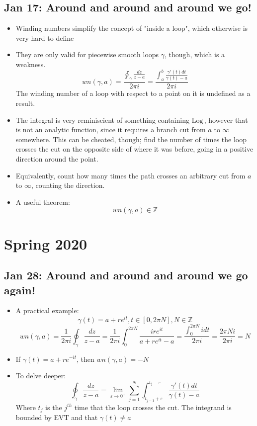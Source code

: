 \documentclass[10pt, oneside]{article}
\let\ep\varepsilon
\newcommand{\Z}{\mathbb{Z}}
\newcommand{\Log}{\text{Log} \,}
\begin{document}
\subsection{Jan 17: Around and around and around we go!}
\begin{itemize}
    \item Winding numbers simplify the concept of "inside a loop", which otherwise is very hard to define
    \item They are only valid for piecewise smooth loops $\gamma$, though, which is a weakness.
        \[wn(\gamma,a) = \frac{\oint_\gamma \frac{dz}{z - a}}{2\pi i} = \frac{\int_a^b \frac{\gamma'(t) dt}{\gamma(t) - a}}{2\pi i}\]
        The winding number of a loop with respect to a point on it is undefined as a result.
    \item The integral is very reminiscient of something containing $\Log$, however that is not an analytic function, since it requires a branch cut from $a$ to $\infty$ somewhere. This can be cheated, though; find the number of times the loop crosses the cut on the opposite side of where it was before, going in a positive direction around the point.
    \item Equivalently, count how many times the path crosses an arbitrary cut from $a$ to $\infty$, counting the direction.
    \item A useful theorem:
        \[wn(\gamma,a) \in \Z\]
\end{itemize}

\section{Spring 2020}

\subsection{Jan 28: Around and around and around we go again!}
\begin{itemize}
    \item A practical example:
        \[\gamma(t) = a + re^{it}, t \in [0,2\pi N], N \in \Z\]
        \[wn(\gamma,a) = \frac{1}{2\pi i} \oint_\gamma \frac{dz}{z-a} = \frac{1}{2\pi i} \int_0^{2\pi N}\frac{ire^{it}}{a + re^{it} - a} = \frac{\int_0^{2\pi N} i dt}{2\pi i} = \frac{2 \pi N i}{2 \pi i} = N\]
    \item If $\gamma(t) = a + re^{-it}$, then $wn(\gamma,a) = -N$
    \item To delve deeper:
        \[\oint_\gamma \frac{dz}{z-a} = \lim_{\ep \rightarrow 0^+} \sum_{j=1}^N \int_{t_{j-1} + \ep}^{t_j - \ep} \frac{\gamma'(t) dt}{\gamma(t) - a}\]
        Where $t_j$ is the $j^{th}$ time that the loop crosses the cut. The integrand is bounded by EVT and that $\gamma(t) \neq a$
\end{itemize}
\end{document}
